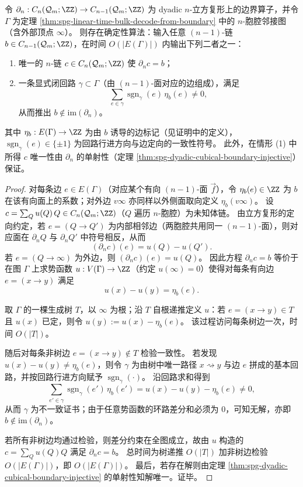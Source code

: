 \begin{theorem}\label{thm:spg-integer-bulk-decode-or-cycle-certificate}
令 \(\partial_n:C_n(\mathcal Q_m;\ZZ)\to C_{n-1}(\mathcal Q_m;\ZZ)\) 为 dyadic \(n\)-立方复形上的边界算子，并令 \(\Gamma\) 为定理 \ref{thm:spg-linear-time-bulk-decode-from-boundary} 中的 \(n\)-胞腔邻接图（含外部顶点 \(\infty\)）。
则存在确定性算法：输入任意 \((n-1)\)-链 \(b\in C_{n-1}(\mathcal Q_m;\ZZ)\)，在时间 \(O(|E(\Gamma)|)\) 内输出下列二者之一：
\begin{enumerate}
  \item 唯一的 \(n\)-链 \(c\in C_n(\mathcal Q_m;\ZZ)\) 使 \(\partial_n c=b\)；
  \item 一条显式闭回路 \(\gamma\subset\Gamma\)（由 \((n-1)\)-面对应的边组成），满足
  \[
  \sum_{e\in\gamma}\operatorname{sgn}_\gamma(e)\,\eta_b(e)\neq 0,
  \]
  从而推出 \(b\notin \mathrm{im}(\partial_n)\)。
\end{enumerate}
其中 \(\eta_b:E(\Gamma)\to\ZZ\) 为由 \(b\) 诱导的边标记（见证明中的定义），\(\operatorname{sgn}_\gamma(e)\in\{\pm1\}\) 为回路行进方向与边定向的一致性符号。
此外，在情形 (1) 中所得 \(c\) 唯一性由 \(\partial_n\) 的单射性（定理 \ref{thm:spg-dyadic-cubical-boundary-injective}）保证。
\end{theorem}
\begin{proof}
对每条边 \(e\in E(\Gamma)\)（对应某个有向 \((n-1)\)-面 \(\vec f\)），令 \(\eta_b(e)\in\ZZ\) 为 \(b\) 在该有向面上的系数；对外边 \(v\infty\) 亦同样以外侧面取向定义 \(\eta_b(v\infty)\)。
设 \(c=\sum_{Q}u(Q)\,Q\in C_n(\mathcal Q_m;\ZZ)\)（\(Q\) 遍历 \(n\)-胞腔）为未知体链。
由立方复形的定向约定，若 \(e=(Q\to Q')\) 为内部相邻边（两胞腔共用同一 \((n-1)\)-面），则对应面在 \(\partial_n Q\) 与 \(\partial_n Q'\) 中符号相反，从而
\[
(\partial_n c)(e)=u(Q)-u(Q').
\]
若 \(e=(Q\to\infty)\) 为外边，则
\(
(\partial_n c)(e)=u(Q)
\)。
因此方程 \(\partial_n c=b\) 等价于在图 \(\Gamma\) 上求势函数 \(u:V(\Gamma)\to\ZZ\)（约定 \(u(\infty)=0\)）使得对每条有向边 \(e=(x\to y)\) 满足
\[
u(x)-u(y)=\eta_b(e).
\]
\par
取 \(\Gamma\) 的一棵生成树 \(T\)，以 \(\infty\) 为根；沿 \(T\) 自根递推定义 \(u\)：若 \(e=(x\to y)\in T\) 且 \(u(x)\) 已定，则令 \(u(y):=u(x)-\eta_b(e)\)。
该过程访问每条树边一次，时间 \(O(|T|)\)。
\par
随后对每条非树边 \(e=(x\to y)\notin T\) 检验一致性。
若发现 \(u(x)-u(y)\neq \eta_b(e)\)，则令 \(\gamma\) 为由树中唯一路径 \(x\rightsquigarrow y\) 与边 \(e\) 拼成的基本回路，并按回路行进方向赋予 \(\operatorname{sgn}_\gamma(\cdot)\)。
沿回路求和得到
\[
\sum_{e'\in\gamma}\operatorname{sgn}_\gamma(e')\,\eta_b(e')
=u(x)-u(y)-\eta_b(e)\neq 0,
\]
从而 \(\gamma\) 为不一致证书；由于任意势函数的环路差分和必须为 \(0\)，可知无解，亦即 \(b\notin\mathrm{im}(\partial_n)\)。
\par
若所有非树边均通过检验，则差分约束在全图成立，故由 \(u\) 构造的 \(c=\sum_Q u(Q)Q\) 满足 \(\partial_n c=b\)。
总时间为树递推 \(O(|T|)\) 加非树边检验 \(O(|E(\Gamma)|)\)，即 \(O(|E(\Gamma)|)\)。
最后，若存在解则由定理 \ref{thm:spg-dyadic-cubical-boundary-injective} 的单射性知解唯一。证毕。
\end{proof}


